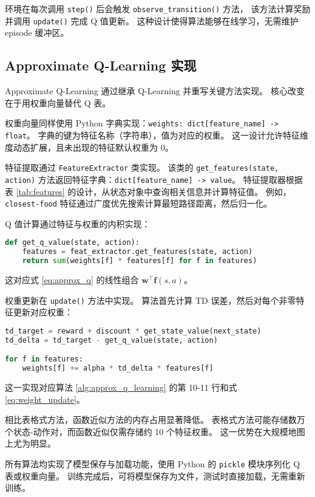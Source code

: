 环境在每次调用 \texttt{step()} 后会触发 \texttt{observe\_transition()} 方法，
该方法计算奖励并调用 \texttt{update()} 完成 Q 值更新。
这种设计使得算法能够在线学习，无需维护 episode 缓冲区。

\subsection{Approximate Q-Learning 实现}

Approximate Q-Learning 通过继承 Q-Learning 并重写关键方法实现。
核心改变在于用权重向量替代 Q 表。

权重向量同样使用 Python 字典实现：\texttt{weights: dict[feature\_name] -> float}。
字典的键为特征名称（字符串），值为对应的权重。
这一设计允许特征维度动态扩展，且未出现的特征默认权重为 0。

特征提取通过 \texttt{FeatureExtractor} 类实现。
该类的 \texttt{get\_features(state, action)} 方法返回特征字典：\texttt{dict[feature\_name] -> value}。
特征提取器根据表 \ref{tab:features} 的设计，从状态对象中查询相关信息并计算特征值。
例如，\texttt{closest-food} 特征通过广度优先搜索计算最短路径距离，然后归一化。

Q 值计算通过特征与权重的内积实现：
\begin{lstlisting}[language=Python, basicstyle=\small\ttfamily]
def get_q_value(state, action):
    features = feat_extractor.get_features(state, action)
    return sum(weights[f] * features[f] for f in features)
\end{lstlisting}
这对应式 \eqref{eq:approx_q} 的线性组合 $\mathbf{w}^\top \mathbf{f}(s,a)$。

权重更新在 \texttt{update()} 方法中实现。
算法首先计算 TD 误差，然后对每个非零特征更新对应权重：
\begin{lstlisting}[language=Python, basicstyle=\small\ttfamily]
td_target = reward + discount * get_state_value(next_state)
td_delta = td_target - get_q_value(state, action)

for f in features:
    weights[f] += alpha * td_delta * features[f]
\end{lstlisting}
这一实现对应算法 \ref{alg:approx_q_learning} 的第 10-11 行和式 \eqref{eq:weight_update}。

相比表格式方法，函数近似方法的内存占用显著降低。
表格式方法可能存储数万个状态-动作对，而函数近似仅需存储约 10 个特征权重。
这一优势在大规模地图上尤为明显。

所有算法均实现了模型保存与加载功能，使用 Python 的 \texttt{pickle} 模块序列化 Q 表或权重向量。
训练完成后，可将模型保存为文件，测试时直接加载，无需重新训练。


